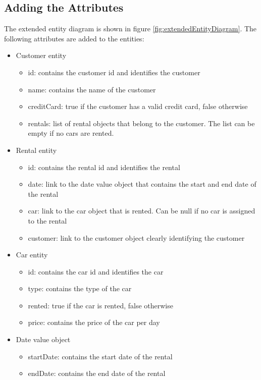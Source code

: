 \subsection*{Adding the Attributes}
The extended entity diagram is shown in figure \ref{fig:extendedEntityDiagram}.
The following attributes are added to the entities:
\begin{itemize}
    \item Customer entity
    \begin{itemize}
        \item id: contains the customer id and identifies the customer
        \item name: contains the name of the customer
        \item creditCard: true if the customer has a valid credit card, false otherwise
        \item rentals: list of rental objects that belong to the customer. The list can be empty if no cars are rented.
    \end{itemize}
    \item Rental entity
    \begin{itemize}
        \item id: contains the rental id and identifies the rental
        \item date: link to the date value object that contains the start and end date of the rental
        \item car: link to the car object that is rented. Can be null if no car is assigned to the rental
        \item customer: link to the customer object clearly identifying the customer
    \end{itemize}
    \item Car entity
    \begin{itemize}
        \item id: contains the car id and identifies the car
        \item type: contains the type of the car
        \item rented: true if the car is rented, false otherwise
        \item price: contains the price of the car per day
    \end{itemize}
    \item Date value object
    \begin{itemize}
        \item startDate: contains the start date of the rental
        \item endDate: contains the end date of the rental
    \end{itemize}
\end{itemize}

